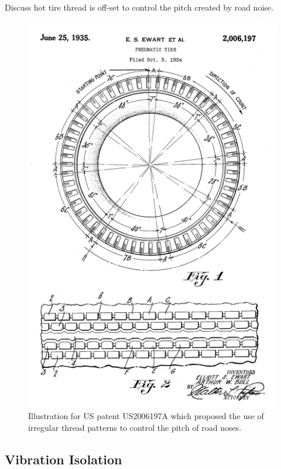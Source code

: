 \documentclass[12pt,letter]{article}
\numberwithin{ex}{section} %
\numberwithin{re}{section} %
\newtheorem{vcs}{Vibration Case Studies}
\numberwithin{vcs}{section} %
\newenvironment{vibration_case_studies}{\begin{mdframed}[linecolor=orange,middlelinewidth=2mm,roundcorner=20pt]\begin{vcs}\normalfont}{\end{vcs}\end{mdframed}}
\begin{document}
		\begin{vibration_case_studies}
	Discuss hot tire thread is off-set to control the pitch created by road noise.
	\begin{figure}[H]
		\centering
		\includegraphics[width=4.5in]{../figures/tire_tred_patent.png}
		\caption{Illustration for US patent US2006197A which proposed the use of irregular thread patterns to control the pitch of road noses\protect\footnotemark[1].}
	\end{figure}	
\end{vibration_case_studies}








\subsection{Vibration Isolation}
\end{document}
